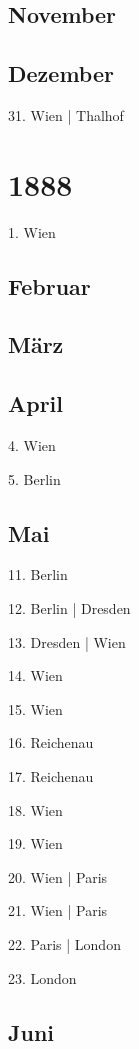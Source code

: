 \documentclass[twoside=false,titlepage=false,open=any, parskip=never, fontsize=10pt, headings=small, chapterprefix=false, appendixprefix=false, DIV=15]{scrbook}
\begin{document}
\begin{multicols}{3}
            \section*{November}
            \section*{Dezember}
            31. Wien | Thalhof\par
            \chapter*{1888}
            1. Wien\par
            \section*{Februar}
            \section*{März}
            \section*{April}
            4. Wien\par
            5. Berlin\par
            \section*{Mai}
            11. Berlin\par
            12. Berlin | Dresden\par
            13. Dresden | Wien\par
            14. Wien\par
            15. Wien\par
            16. Reichenau\par
            17. Reichenau\par
            18. Wien\par
            19. Wien\par
            20. Wien | Paris\par
            21. Wien | Paris\par
            22. Paris | London\par
            23. London\par
            \section*{Juni}

\end{multicols}
\end{document}
